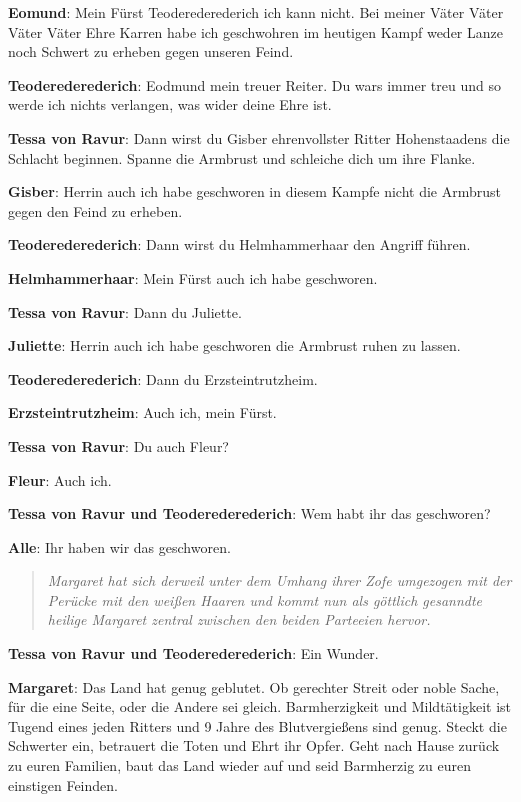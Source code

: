 \documentclass[a5paper,6pt]{book}
\begin{document}
\textbf{Eomund}: Mein Fürst Teoderederederich ich kann nicht. Bei meiner Väter Väter Väter Väter Ehre Karren habe ich geschwohren im heutigen Kampf weder Lanze noch Schwert zu erheben gegen unseren Feind.

\textbf{Teoderederederich}: Eodmund mein treuer Reiter. Du wars immer treu und so werde ich nichts verlangen, was wider deine Ehre ist.

\textbf{Tessa von Ravur}: Dann wirst du Gisber ehrenvollster Ritter Hohenstaadens die Schlacht beginnen. Spanne die Armbrust und schleiche dich um ihre Flanke.

\textbf{Gisber}: Herrin auch ich habe geschworen in diesem Kampfe nicht die Armbrust gegen den Feind zu erheben.

\textbf{Teoderederederich}: Dann wirst du Helmhammerhaar den Angriff führen.

\textbf{Helmhammerhaar}: Mein Fürst auch ich habe geschworen.

\textbf{Tessa von Ravur}: Dann du Juliette.

\textbf{Juliette}: Herrin auch ich habe geschworen die Armbrust ruhen zu lassen.

\textbf{Teoderederederich}: Dann du Erzsteintrutzheim.

\textbf{Erzsteintrutzheim}: Auch ich, mein Fürst.

\textbf{Tessa von Ravur}: Du auch Fleur?

\textbf{Fleur}: Auch ich.

\textbf{Tessa von Ravur und Teoderederederich}: Wem habt ihr das geschworen?

\textbf{Alle}: Ihr haben wir das geschworen.

\begin{quote}
  \textit{Margaret hat sich derweil unter dem Umhang ihrer Zofe umgezogen mit der Perücke mit den weißen Haaren und kommt nun als göttlich gesanndte heilige Margaret zentral zwischen den beiden Parteeien hervor.}
 \end{quote}


\textbf{Tessa von Ravur und Teoderederederich}: Ein Wunder.

\textbf{Margaret}: Das Land hat genug geblutet. Ob gerechter Streit oder noble Sache, für die eine Seite, oder die Andere sei gleich. Barmherzigkeit und Mildtätigkeit ist Tugend eines jeden Ritters und 9 Jahre des Blutvergießens sind genug. Steckt die Schwerter ein, betrauert die Toten und Ehrt ihr Opfer. Geht nach Hause zurück zu euren Familien, baut das Land wieder auf und seid Barmherzig zu euren einstigen Feinden.
\end{document}
